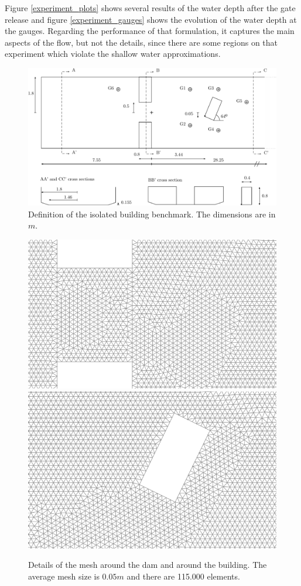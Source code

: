 \documentclass[a4paper,12pt]{article}
\begin{document}
Figure \ref{experiment_plots} shows several results of the water depth after the gate release and figure \ref{experiment_gauges} shows the evolution of the water depth at the gauges.
Regarding the performance of that formulation, it captures the main aspects of the flow, but not the details, since there are some regions on that experiment which violate the shallow water approximations.

\begin{figure}[H]
\centering
\includegraphics[width=\textwidth]{img/exp/sketch.pdf}
\caption{Definition of the isolated building benchmark. The dimensions are in $m$.}
\label{experiment_sketch}
\end{figure}


\begin{figure}[H]
\centering
\includegraphics[width=.49\textwidth]{img/exp/mesh_dam.png}
\hfill
\includegraphics[width=.47\textwidth]{img/exp/mesh_building.png}
\caption{Details of the mesh around the dam and around the building. The average mesh size is $0.05m$ and there are 115.000 elements.}
\label{experiment_mesh}
\end{figure}
\end{document}
